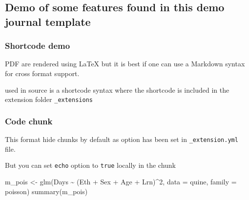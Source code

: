 \documentclass[
]{aft}
\newenvironment{Shaded}{\begin{snugshade}}{\end{snugshade}}
\newcommand{\AttributeTok}[1]{\textcolor[rgb]{0.40,0.45,0.13}{#1}}
\newcommand{\DecValTok}[1]{\textcolor[rgb]{0.68,0.00,0.00}{#1}}
\newcommand{\FunctionTok}[1]{\textcolor[rgb]{0.28,0.35,0.67}{#1}}
\newcommand{\NormalTok}[1]{\textcolor[rgb]{0.00,0.23,0.31}{#1}}
\newcommand{\OtherTok}[1]{\textcolor[rgb]{0.00,0.23,0.31}{#1}}
\newcommand{\SpecialCharTok}[1]{\textcolor[rgb]{0.37,0.37,0.37}{#1}}
\begin{document}
\hypertarget{demo-of-some-features-found-in-this-demo-journal-template}{%
\subsection{Demo of some features found in this demo journal
template}\label{demo-of-some-features-found-in-this-demo-journal-template}}

\hypertarget{sec-shortcode}{%
\subsubsection{Shortcode demo}\label{sec-shortcode}}

PDF are rendered using {\LaTeX} but it is best if one can use a Markdown
syntax for cross format support.

\texttt{} used in source is a shortcode syntax where the shortcode is
included in the extension folder \texttt{\_extensions}

\hypertarget{sec-chunks}{%
\subsubsection{Code chunk}\label{sec-chunks}}

This format hide chunks by default as option has been set in
\texttt{\_extension.yml} file.

But you can set \texttt{echo} option to \texttt{true} locally in the
chunk

\begin{Shaded}
\begin{Highlighting}[]
\NormalTok{m\_pois }\OtherTok{\textless{}{-}} \FunctionTok{glm}\NormalTok{(Days }\SpecialCharTok{\textasciitilde{}}\NormalTok{ (Eth }\SpecialCharTok{+}\NormalTok{ Sex }\SpecialCharTok{+}\NormalTok{ Age }\SpecialCharTok{+}\NormalTok{ Lrn)}\SpecialCharTok{\^{}}\DecValTok{2}\NormalTok{, }\AttributeTok{data =}\NormalTok{ quine, }\AttributeTok{family =}\NormalTok{ poisson)}
\FunctionTok{summary}\NormalTok{(m\_pois)}
\end{Highlighting}
\end{Shaded}
\end{document}
